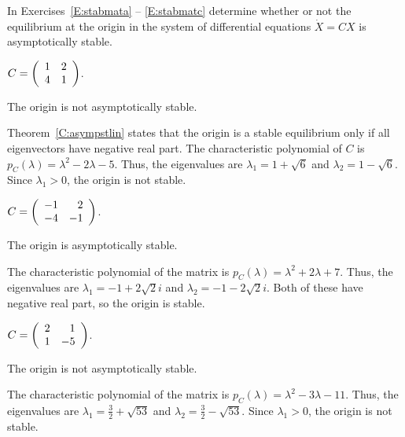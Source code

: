 \documentclass{ximera}
\begin{document}
\noindent In Exercises~\ref{E:stabmata} -- \ref{E:stabmatc} determine
whether or not the equilibrium at the origin in the system of differential
equations $\dot{X}=CX$ is asymptotically stable.
\begin{exercise} \label{E:stabmata}
$C=\left(\begin{array}{rr} 1 & 2\\ 4 &1\end{array}\right)$.

\begin{solution}
\ans The origin is not asymptotically stable.

\soln Theorem~\ref{C:asympstlin} states that the origin is a stable
equilibrium only if all eigenvectors have negative real part.  The
characteristic polynomial of $C$ is $p_C(\lambda) = \lambda^2 - 2\lambda
- 5$.  Thus, the eigenvalues are $\lambda_1 = 1 + \sqrt{6}$ and
$\lambda_2 = 1 - \sqrt{6}$. Since $\lambda_1 > 0$, the origin
is not stable.

\end{solution}
\end{exercise}
\begin{exercise} \label{E:stabmatb}
$C=\left(\begin{array}{rr} -1 & 2\\ -4 &-1\end{array}\right)$.

\begin{solution}
\ans The origin is asymptotically stable.

\soln The characteristic polynomial of the matrix is $p_C(\lambda) =
\lambda^2 + 2\lambda + 7$.  Thus, the eigenvalues are $\lambda_1 =
-1 + 2\sqrt{2}i$ and $\lambda_2 = -1 - 2\sqrt{2}i$.  Both of these
have negative real part, so the origin is stable.

\end{solution}
\end{exercise}
\begin{exercise} \label{E:stabmatc}
$C=\left(\begin{array}{rr} 2 & 1\\ 1 &-5\end{array}\right)$.

\begin{solution}
\ans The origin is not asymptotically stable.

\soln The characteristic polynomial of the matrix is $p_C(\lambda) =
\lambda^2 - 3\lambda - 11$.  Thus, the eigenvalues are $\lambda_1 =
\frac{3}{2} + \sqrt{53}$ and $\lambda_2 = \frac{3}{2} - \sqrt{53}$.
Since $\lambda_1 > 0$, the origin is not stable.

\end{solution}
\end{exercise}
\end{document}
